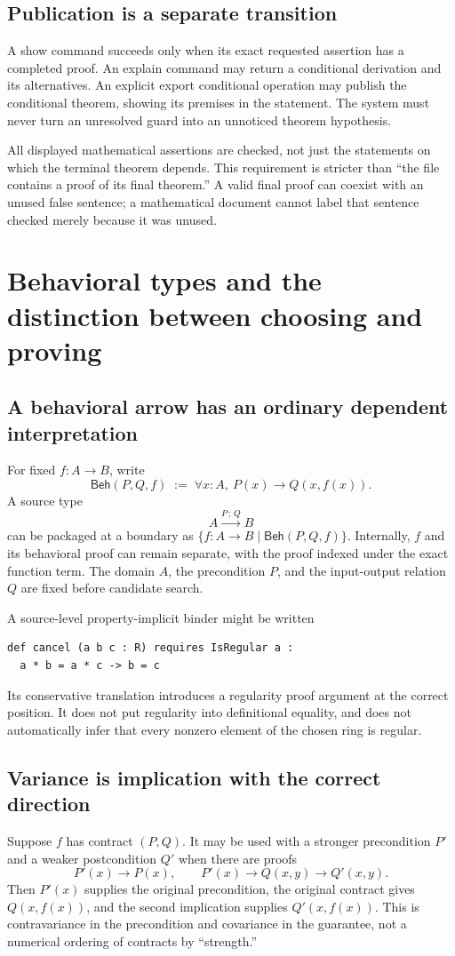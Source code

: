 \documentclass[11pt,a4paper]{article}
\newcommand{\Beh}{\mathsf{Beh}}\newcommand{\obs}{\mathsf{obs}}
\newcommand{\kw}[1]{\textsf{#1}}
\theoremstyle{plain}
\theoremstyle{definition}
\theoremstyle{remark}
\begin{document}
\subsection{Publication is a separate transition}
A \kw{show} command succeeds only when its exact requested assertion has a completed proof. An \kw{explain} command may return a conditional derivation and its alternatives. An explicit \kw{export conditional} operation may publish the conditional theorem, showing its premises in the statement. The system must never turn an unresolved guard into an unnoticed theorem hypothesis.

All displayed mathematical assertions are checked, not just the statements on which the terminal theorem depends. This requirement is stricter than ``the file contains a proof of its final theorem.'' A valid final proof can coexist with an unused false sentence; a mathematical document cannot label that sentence checked merely because it was unused.

\section{Behavioral types and the distinction between choosing and proving}\label{sec:behavior}

\subsection{A behavioral arrow has an ordinary dependent interpretation}
For fixed $f:A\to B$, write
\[
 \Beh(P,Q,f)\;:=\;\forall x:A,\ P(x)\to Q(x,f(x)).
\]
A source type
\[
 A\xrightarrow{P\,;\,Q}B
\]
can be packaged at a boundary as $\{f:A\to B\mid\Beh(P,Q,f)\}$. Internally, $f$ and its behavioral proof can remain separate, with the proof indexed under the exact function term. The domain $A$, the precondition $P$, and the input-output relation $Q$ are fixed before candidate search.

A source-level property-implicit binder might be written
\Needspace{72pt}
\begin{lstlisting}
def cancel (a b c : R) requires IsRegular a :
  a * b = a * c -> b = c
\end{lstlisting}
Its conservative translation introduces a regularity proof argument at the correct position. It does not put regularity into definitional equality, and does not automatically infer that every nonzero element of the chosen ring is regular.

\subsection{Variance is implication with the correct direction}
Suppose $f$ has contract $(P,Q)$. It may be used with a stronger precondition $P'$ and a weaker postcondition $Q'$ when there are proofs
\[
 P'(x)\to P(x),\qquad
 P'(x)\to Q(x,y)\to Q'(x,y).
\]
Then $P'(x)$ supplies the original precondition, the original contract gives $Q(x,f(x))$, and the second implication supplies $Q'(x,f(x))$. This is contravariance in the precondition and covariance in the guarantee, not a numerical ordering of contracts by ``strength.''
\end{document}
